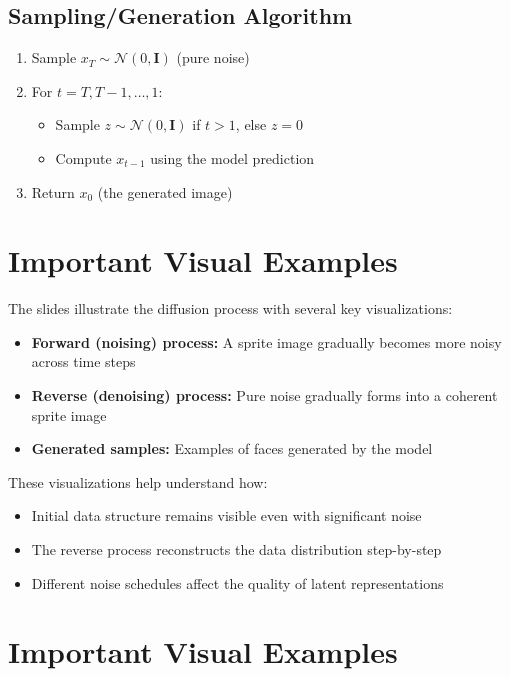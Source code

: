 \subsection*{Sampling/Generation Algorithm}
\begin{enumerate}
    \item Sample $x_T \sim \mathcal{N}(0, \mathbf{I})$ (pure noise)
    \item For $t = T, T-1, \ldots, 1$:
    \begin{itemize}
        \item Sample $z \sim \mathcal{N}(0, \mathbf{I})$ if $t > 1$, else $z = 0$
        \item Compute $x_{t-1}$ using the model prediction
    \end{itemize}
    \item Return $x_0$ (the generated image)
\end{enumerate}

\section{Important Visual Examples}

The slides illustrate the diffusion process with several key visualizations:

\begin{itemize}
    \item \textbf{Forward (noising) process:} A sprite image gradually becomes more noisy across time steps
    \item \textbf{Reverse (denoising) process:} Pure noise gradually forms into a coherent sprite image
    \item \textbf{Generated samples:} Examples of faces generated by the model
\end{itemize}

These visualizations help understand how:
\begin{itemize}
    \item Initial data structure remains visible even with significant noise
    \item The reverse process reconstructs the data distribution step-by-step
    \item Different noise schedules affect the quality of latent representations
\end{itemize}

\section{Important Visual Examples}

